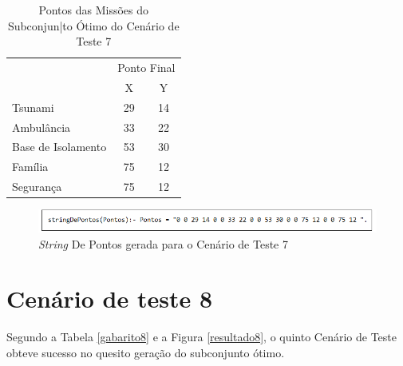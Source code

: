 \begin{table}[!h]
\centering
\caption{Pontos das Missões do Subconjun|to Ótimo do Cenário de Teste 7}
\label{pontoCT7}
\begin{tabular}{lcc}
\rowcolor[HTML]{00D2CB} 
\multicolumn{1}{c}{\cellcolor[HTML]{00D2CB}} & \multicolumn{2}{l}{\cellcolor[HTML]{00D2CB}Ponto Final} \\ 
\rowcolor[HTML]{C0F2F0} 
\multicolumn{1}{c}{\cellcolor[HTML]{00D2CB}Missão} & \multicolumn{1}{c}{\cellcolor[HTML]{C0F2F0}X} & \multicolumn{1}{c}{\cellcolor[HTML]{C0F2F0}Y} \\
 Tsunami & 29 & 14 \\
 Ambulância & 33 & 22 \\
 Base de Isolamento & 53 & 30 \\
 Família & 75 & 12 \\
 Segurança & 75 & 12    \\          
\end{tabular}
\end{table}


\FloatBarrier
\begin{figure}[!h]
\centering
\includegraphics[keepaspectratio=true,scale=0.7]{figuras/stringCT7.png}
\caption{\textit{String} De Pontos gerada para o Cenário de Teste 7}
\label{stringCT7}
\end{figure}



\section{Cenário de teste 8}

	Segundo a Tabela \ref{gabarito8} e a Figura \ref{resultado8}, o quinto Cenário de Teste obteve sucesso no quesito geração do subconjunto ótimo. 


